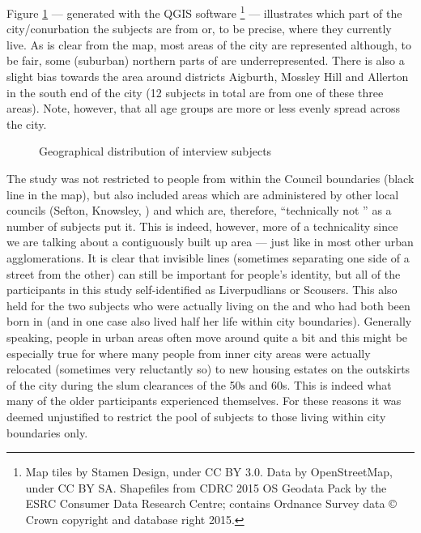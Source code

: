 Figure \ref{fig.map.participants} --- generated with the QGIS software \parencite{QGIS2016}\footnote{Map tiles by Stamen Design, under CC BY 3.0. Data by OpenStreetMap, under CC BY SA. Shapefiles from CDRC 2015 OS Geodata Pack by the ESRC Consumer Data Research Centre; contains Ordnance Survey data © Crown copyright and database right 2015.} --- illustrates which part of the city/conurbation the subjects are from or, to be precise, where they currently live. As is clear from the map, most areas of the city are represented although, to be fair, some (suburban) northern parts of  are underrepresented. There is also a slight bias towards the area around  districts Aigburth, Mossley Hill and Allerton in the south end of the city (12 subjects in total are from one of these three areas). Note, however, that all age groups are more or less evenly spread across the city.

	\begin{figure}[h]
		\centering
		\caption{Geographical distribution of interview subjects}\label{fig.map.participants}
	\end{figure}

The study was not restricted to people from within the  Council boundaries (black line in the map), but also included areas which are administered by other local councils (Sefton, Knowsley, ) and which are, therefore, ``technically not '' as a number of subjects put it. This is indeed, however, more of a technicality since we are talking about a contiguously built up area --- just like in most other urban agglomerations. It is clear that invisible lines (sometimes separating one side of a street from the other) can still be important for people's identity, but all of the participants in this study self-identified as Liverpudlians or Scousers. This also held for the two subjects who were actually living on the  and who had both been born in  (and in one case also lived half her life within  city boundaries). Generally speaking, people in urban areas often move around quite a bit and this might be especially true for  where many people from inner city areas were actually relocated (sometimes very reluctantly so) to new housing estates on the outskirts of the city during the slum clearances of the 50s and 60s. This is indeed what many of the older participants experienced themselves. For these reasons it was deemed unjustified to restrict the pool of subjects to those living within  city boundaries only.


